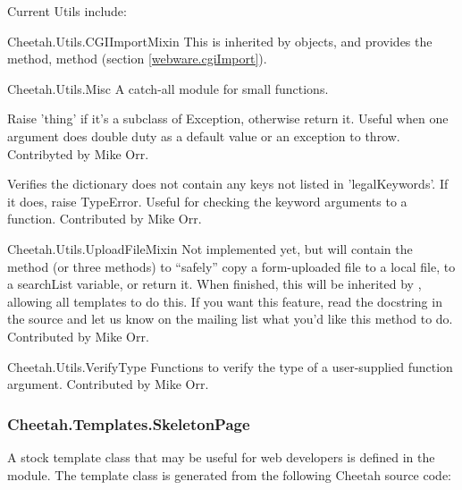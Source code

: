 Current Utils include:
\begin{description}
\item{Cheetah.Utils.CGIImportMixin} This is inherited by 
     objects, and provides the method,  method
     (section \ref{webware.cgiImport}).

\item{Cheetah.Utils.Misc} A catch-all module for small functions.
     \begin{description}
     \item{}  Raise 'thing' if it's a 
          subclass of Exception, otherwise return it.  Useful when one
	  argument does double duty as a default value or an exception to
	  throw.  Contribyted by Mike Orr.

     \item{}  
          Verifies the dictionary does not contain any keys not listed in
	  'legalKeywords'.  If it does, raise TypeError.  Useful for
	  checking the keyword arguments to a function.  Contributed by
	  Mike Orr.
     \end{description}

\item{Cheetah.Utils.UploadFileMixin} Not implemented yet, but will contain
     the  method (or three methods) to ``safely'' copy a
     form-uploaded file to a local file, to a searchList variable, or return
     it.  When finished, this will be inherited by , allowing 
     all templates to do this.  If you want this feature, read the docstring
     in the source and let us know on the mailing list what you'd like this
     method to do.  Contributed by Mike Orr.

\item{Cheetah.Utils.VerifyType} Functions to verify the type of a
     user-supplied function argument.  Contributed by Mike Orr.
\end{description}

\subsubsection{Cheetah.Templates.SkeletonPage}
\label{libraries.templates.skeletonPage}

A stock template class that may be useful for web developers is defined in
the  module.  The 
template class is generated from the following Cheetah source code:

